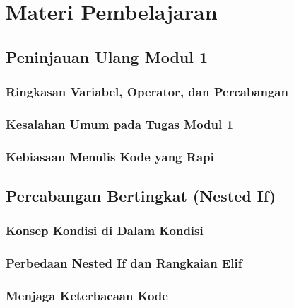\documentclass[12pt,a4paper]{article}
\begin{document}
\section{Materi Pembelajaran}

\subsection{Peninjauan Ulang Modul 1}

\subsubsection{Ringkasan Variabel, Operator, dan Percabangan}

\subsubsection{Kesalahan Umum pada Tugas Modul 1}

\subsubsection{Kebiasaan Menulis Kode yang Rapi}

\subsection{Percabangan Bertingkat (Nested If)}

\subsubsection{Konsep Kondisi di Dalam Kondisi}

\subsubsection{Perbedaan Nested If dan Rangkaian Elif}

\subsubsection{Menjaga Keterbacaan Kode}
\end{document}
